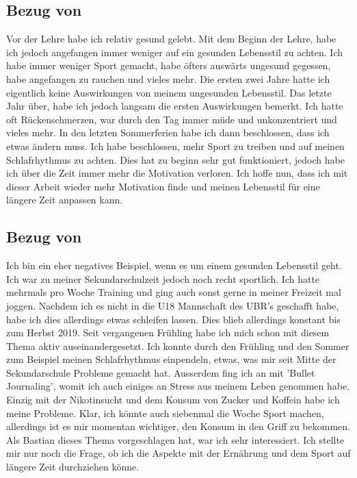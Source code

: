 \subsection{Bezug von \dario}
\authortoc{\dario}{\subsectionident}
\label{bezug:dario}
Vor der Lehre habe ich relativ gesund gelebt. Mit dem Beginn der Lehre, habe ich jedoch angefangen immer weniger auf ein gesunden Lebensstil zu achten.
\newline
Ich habe immer weniger Sport gemacht, habe öfters auswärts ungesund gegessen, habe angefangen zu rauchen und vieles mehr. 
\newline
Die ersten zwei Jahre hatte ich eigentlich keine Auswirkungen von meinem ungesunden Lebensstil. 
\newline
Das letzte Jahr über, habe ich jedoch langsam die ersten Auswirkungen bemerkt. Ich hatte oft Rückenschmerzen, war durch den Tag immer müde und unkonzentriert und vieles mehr.
\newline
In den letzten Sommerferien habe ich dann beschlossen, dass ich etwas ändern muss. Ich habe beschlossen, mehr Sport zu treiben und auf meinen Schlafrhythmus zu achten. 
\newline
Dies hat zu beginn sehr gut funktioniert, jedoch habe ich über die Zeit immer mehr die Motivation verloren.
\newline
Ich hoffe nun, dass ich mit dieser Arbeit wieder mehr Motivation finde und meinen Lebensstil für eine längere Zeit anpassen kann.
\subsection{Bezug von \jonas}
\authortoc{\jonas}{\subsectionident}
\label{bezug:jonas}
Ich bin ein eher negatives Beispiel, wenn es um einem gesunden Lebensstil geht. Ich war zu meiner Sekundarschulzeit jedoch noch recht sportlich. Ich hatte mehrmals pro Woche Training und ging auch sonst gerne in meiner Freizeit mal joggen. Nachdem ich es nicht in die U18 Mannschaft des UBR's geschafft habe, habe ich dies allerdings etwas schleifen lassen.
\newline
Dies blieb allerdings konstant bis zum Herbst 2019. Seit vergangenen Frühling habe ich mich schon mit diesem Thema aktiv auseinandergesetzt. Ich konnte durch den Frühling und den Sommer zum Beispiel meinen Schlafrhythmus einpendeln, etwas, was mir seit Mitte der Sekundarschule Probleme gemacht hat. Ausserdem fing ich an mit 'Bullet Journaling', womit ich auch einiges an Stress aus meinem Leben genommen habe. Einzig mit der Nikotinsucht und dem Konsum von Zucker und Koffein habe ich meine Probleme. Klar, ich könnte auch siebenmal die Woche Sport machen, allerdings ist es mir momentan wichtiger, den Konsum in den Griff zu bekommen.
\newline
\newline
Als Bastian dieses Thema vorgeschlagen hat, war ich sehr interessiert. Ich stellte mir nur noch die Frage, ob ich die Aspekte mit der Ernährung und dem Sport auf längere Zeit durchziehen könne.